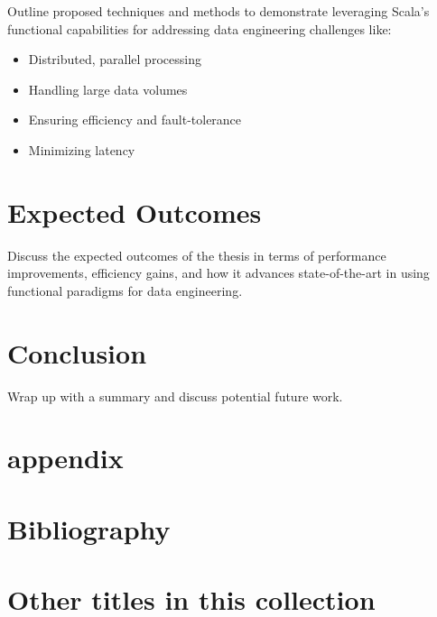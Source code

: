 Outline proposed techniques and methods to demonstrate leveraging Scala's functional capabilities for addressing data engineering challenges like:

\begin{itemize}
\item Distributed, parallel processing
\item Handling large data volumes
\item Ensuring efficiency and fault-tolerance
\item Minimizing latency
\end{itemize}

\chapter{Expected Outcomes}

Discuss the expected outcomes of the thesis in terms of performance improvements, efficiency gains, and how it advances state-of-the-art in using functional paradigms for data engineering.

\chapter{Conclusion}
Wrap up with a summary and discuss potential future work.

\appendix
\chapter{appendix}
\chapter{Bibliography}
\chapter{Other titles in this collection}

